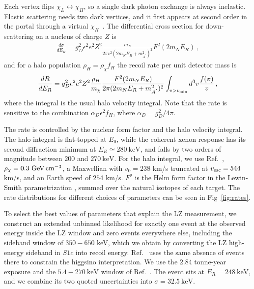 \documentclass[prd,aps,reprint,superscriptaddress,nofootinbib]{revtex4-2}
\newcommand{\keV}{~\text{keV}}
\newcommand{\GeV}{~\text{GeV}}
\begin{document}
Each vertex flips $\chi_L \leftrightarrow \chi_H$, so a single dark photon exchange is always inelastic. Elastic scattering needs two dark vertices, and it first appears at second order in the portal through a virtual $\chi_H$~\cite{Batell:2009vb}. The differential cross section for down-scattering on a nucleus of charge $Z$ is
\begin{align}
    \frac{d\sigma}{d E_R} = g_D^2\epsilon^2e^2Z^2\frac{m_N}{2\pi v^2 (2m_NE_R+m_{A^{'}}^2)^2} F^2(2m_NE_R) \, ,
\end{align}
and for a halo population $\rho_H = \rho_\chi f_H$ the recoil rate per unit detector mass is
\begin{align}\label{eq:rate}
    \frac{dR}{dE_R} =g_D^2\epsilon^2e^2Z^2 \frac{\rho_H}{m_\chi} \frac{F^2(2m_NE_R)}{2\pi (2m_NE_R+m_{A^{'}}^2)^2} \int_{v>v_{\rm min}} d^3v \frac{f(\boldsymbol{v})}{v} \, ,
\end{align}
where the integral is the usual halo velocity integral. Note that the rate is sensitive to the combination $\alpha_D \epsilon^2 f_H$, where $\alpha_D = g_D^2/4\pi$.

The rate is controlled by the nuclear form factor and the halo velocity integral. The halo integral is flat-topped at $E_0$,  while the coherent xenon response has its second diffraction minimum at $E_R \simeq 280\keV$, and falls by two orders of magnitude between $200$ and $270\keV$. For the halo integral, we use  Ref.~\cite{Baxter:2021pqo}, $\rho_\chi = 0.3\GeV\,{\rm cm^{-3}}$, a Maxwellian with $v_0 = 238$ km/s truncated at $v_{\rm esc} = 544$ km/s, and an Earth speed of $254$ km/s. $F^2$ is the Helm form factor in the Lewin-Smith parametrization \cite{Lewin:1995rx}, summed over the natural isotopes of each target. The rate distributions for different choices of parameters can be seen in Fig~\ref{fig:rates}.

To select the best values of parameters that explain the LZ measurement, we construct an extended unbinned likelihood for exactly one event at the observed energy inside the LZ window and zero events everywhere else, including the sideband window of $350-650$ keV, which we obtain by converting the LZ high-energy sideband in $S1c$ into recoil energy. Ref.~\cite{Rodd:2026tyn} uses the same absence of events there to constrain the higgsino interpretation. We use the $2.84$ tonne-year exposure and the $5.4-270\keV$ window of Ref.~\cite{LZ:2026axp}. The event sits at $E_R = 248\keV$, and we combine its two quoted uncertainties into $\sigma = 32.5\keV$.
\end{document}
